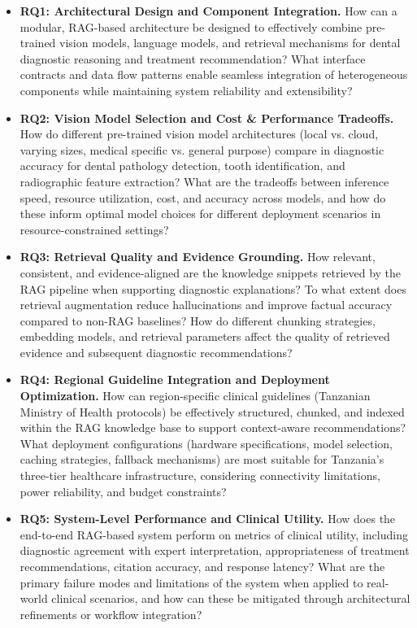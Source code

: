\documentclass[12pt,a4paper]{report}
\begin{document}
	\begin{itemize}
		\item \textbf{RQ1: Architectural Design and Component Integration.} How can a modular, RAG-based architecture be designed to effectively combine pre-trained vision models, language models, and retrieval mechanisms for dental diagnostic reasoning and treatment recommendation? What interface contracts and data flow patterns enable seamless integration of heterogeneous components while maintaining system reliability and extensibility?
		
		\item \textbf{RQ2: Vision Model Selection and Cost \& Performance Tradeoffs.} How do different pre-trained vision model architectures (local vs. cloud, varying sizes, medical specific vs. general purpose) compare in diagnostic accuracy for dental pathology detection, tooth identification, and radiographic feature extraction? What are the tradeoffs between inference speed, resource utilization, cost, and accuracy across models, and how do these inform optimal model choices for different deployment scenarios in resource-constrained settings? \cite{Dashti2024DLCariesUmbrella,Arzani2025AICariesUmbrella,lewis2020retrieval,Wada2025RAGRadiology}
		
		\item \textbf{RQ3: Retrieval Quality and Evidence Grounding.} How relevant, consistent, and evidence-aligned are the knowledge snippets retrieved by the RAG pipeline when supporting diagnostic explanations? To what extent does retrieval augmentation reduce hallucinations and improve factual accuracy compared to non-RAG baselines? How do different chunking strategies, embedding models, and retrieval parameters affect the quality of retrieved evidence and subsequent diagnostic recommendations? \cite{lewis2020retrieval,ji2023survey}
		
		\item \textbf{RQ4: Regional Guideline Integration and Deployment Optimization.} How can region-specific clinical guidelines (Tanzanian Ministry of Health protocols) be effectively structured, chunked, and indexed within the RAG knowledge base to support context-aware recommendations? What deployment configurations (hardware specifications, model selection, caching strategies, fallback mechanisms) are most suitable for Tanzania's three-tier healthcare infrastructure, considering connectivity limitations, power reliability, and budget constraints? \cite{Edward2024OralHealthTZ,tanzania_oral_health_policy,schwendicke2022ai_global}
		
		\item \textbf{RQ5: System-Level Performance and Clinical Utility.} How does the end-to-end RAG-based system perform on metrics of clinical utility, including diagnostic agreement with expert interpretation, appropriateness of treatment recommendations, citation accuracy, and response latency? What are the primary failure modes and limitations of the system when applied to real-world clinical scenarios, and how can these be mitigated through architectural refinements or workflow integration?
	\end{itemize}
	
\end{document}
